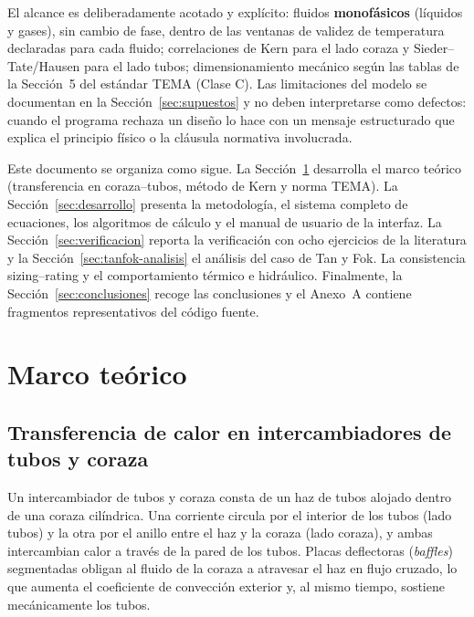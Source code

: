 \documentclass[11pt,a4paper]{article}
\begin{document}
El alcance es deliberadamente acotado y expl\'icito: fluidos
\textbf{monof\'asicos} (l\'iquidos y gases), sin cambio de fase, dentro de las
ventanas de validez de temperatura declaradas para cada fluido; correlaciones
de Kern para el lado coraza y Sieder--Tate/Hausen para el lado tubos;
dimensionamiento mec\'anico seg\'un las tablas de la Secci\'on~5 del est\'andar
TEMA (Clase C). Las limitaciones del modelo se documentan en la
Secci\'on~\ref{sec:supuestos} y no deben interpretarse como defectos: cuando el
programa rechaza un dise\~no lo hace con un mensaje estructurado que explica el
principio f\'isico o la cl\'ausula normativa involucrada.

Este documento se organiza como sigue. La Secci\'on~\ref{sec:marco} desarrolla
el marco te\'orico (transferencia en coraza--tubos, m\'etodo de Kern y norma
TEMA). La Secci\'on~\ref{sec:desarrollo} presenta la metodolog\'ia, el sistema
completo de ecuaciones, los algoritmos de c\'alculo y el manual de usuario de la
interfaz. La Secci\'on~\ref{sec:verificacion} reporta la verificaci\'on con
ocho ejercicios de la literatura y la Secci\'on~\ref{sec:tanfok-analisis} el an\'alisis del caso de Tan y Fok. La
consistencia sizing--rating y el comportamiento t\'ermico e hidr\'aulico.
Finalmente, la Secci\'on~\ref{sec:conclusiones} recoge las conclusiones y el
Anexo~A contiene fragmentos representativos del c\'odigo fuente.

\section{Marco te\'orico}
\label{sec:marco}

\subsection{Transferencia de calor en intercambiadores de tubos y coraza}

Un intercambiador de tubos y coraza consta de un haz de tubos alojado dentro de
una coraza cil\'indrica. Una corriente circula por el interior de los tubos
(lado tubos) y la otra por el anillo entre el haz y la coraza (lado coraza), y
ambas intercambian calor a trav\'es de la pared de los tubos. Placas
deflectoras (\emph{baffles}) segmentadas obligan al fluido de la coraza a
atravesar el haz en flujo cruzado, lo que aumenta el coeficiente de convecci\'on
exterior y, al mismo tiempo, sostiene mec\'anicamente los tubos.
\end{document}
